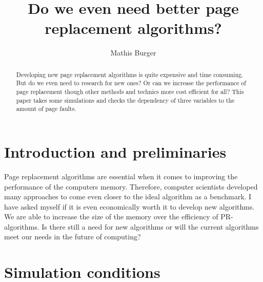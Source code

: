 \documentclass[12pt, reqno]{amsart}
\numberwithin{equation}{section}
\begin{document}
\setcounter{page}{1}



\centerline{}

\centerline{}

\title[Short Title]{Do we even need better page replacement algorithms?}

\author{Mathis Burger}

\begin{abstract}
Developing new page replacement algorithms is quite expensive and time consuming. But do we even need to research for new ones? Or can we
increase the performance of page replacement though other methods and technics more cost efficient for all? This paper takes some simulations
and checks the dependency of three variables to the amount of page faults.
\end{abstract} \maketitle

\section{Introduction and preliminaries}

\noindent Page replacement algorithms are essential when it comes to improving the performance of the computers memory. Therefore, computer scientists developed many
approaches to come even closer to the ideal algorithm as a benchmark. I have asked myself if it is even economically worth it to develop new algorithms. We are able to increase the
size of the memory over the efficiency of PR-algorithms. Is there still a need for new algorithms or will the current algorithms meet our needs in the future of computing?

\section{Simulation conditions}
\end{document}
